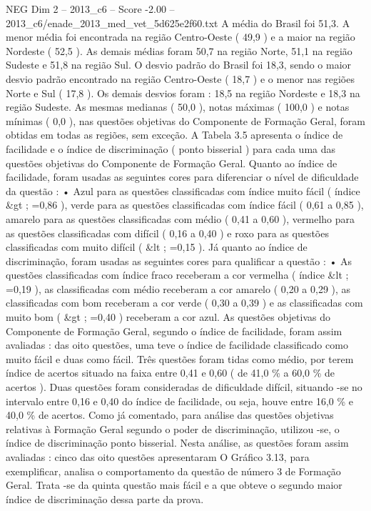 \begin{textsample}{NEG Dim 2 – 2013\_c6 – Score -2.00 – 2013\_c6/enade\_2013\_med\_vet\_5d625e2f60.txt}
A média do Brasil foi 51,3.
A menor média foi encontrada na região Centro-Oeste ( 49,9 ) e a maior na região Nordeste ( 52,5 ).
As demais médias foram 50,7 na região Norte, 51,1 na região Sudeste e 51,8 na região Sul.
O desvio padrão do Brasil foi 18,3, sendo o maior desvio padrão encontrado na região Centro-Oeste ( 18,7 ) e o menor nas regiões Norte e Sul ( 17,8 ).
Os demais desvios foram : 18,5 na região Nordeste e 18,3 na região Sudeste.
As mesmas medianas ( 50,0 ), notas máximas ( 100,0 ) e notas mínimas ( 0,0 ), nas questões objetivas do Componente de Formação Geral, foram obtidas em todas as regiões, sem exceção.
A Tabela 3.5 apresenta o índice de facilidade e o índice de discriminação ( ponto bisserial ) para cada uma das questões objetivas do Componente de Formação Geral.
Quanto ao índice de facilidade, foram usadas as seguintes cores para diferenciar o nível de dificuldade da questão : • Azul para as questões classificadas com índice muito fácil ( índice \&gt ; =0,86 ), verde para as questões classificadas com índice fácil ( 0,61 a 0,85 ), amarelo para as questões classificadas com médio ( 0,41 a 0,60 ), vermelho para as questões classificadas com difícil ( 0,16 a 0,40 ) e roxo para as questões classificadas com muito difícil ( \&lt ; =0,15 ).
Já quanto ao índice de discriminação, foram usadas as seguintes cores para qualificar a questão : • As questões classificadas com índice fraco receberam a cor vermelha ( índice \&lt ; =0,19 ), as classificadas com médio receberam a cor amarelo ( 0,20 a 0,29 ), as classificadas com bom receberam a cor verde ( 0,30 a 0,39 ) e as classificadas com muito bom ( \&gt ; =0,40 ) receberam a cor azul.
As questões objetivas do Componente de Formação Geral, segundo o índice de facilidade, foram assim avaliadas : das oito questões, uma teve o índice de facilidade classificado como muito fácil e duas como fácil.
Três questões foram tidas como médio, por terem índice de acertos situado na faixa entre 0,41 e 0,60 ( de 41,0 \% a 60,0 \% de acertos ).
Duas questões foram consideradas de dificuldade difícil, situando -se no intervalo entre 0,16 e 0,40 do índice de facilidade, ou seja, houve entre 16,0 \% e 40,0 \% de acertos.
Como já comentado, para análise das questões objetivas relativas à Formação Geral segundo o poder de discriminação, utilizou -se, o índice de discriminação ponto bisserial.
Nesta análise, as questões foram assim avaliadas : cinco das oito questões apresentaram O Gráfico 3.13, para exemplificar, analisa o comportamento da questão de número 3 de Formação Geral.
Trata -se da quinta questão mais fácil e a que obteve o segundo maior índice de discriminação dessa parte da prova.

\end{textsample}
